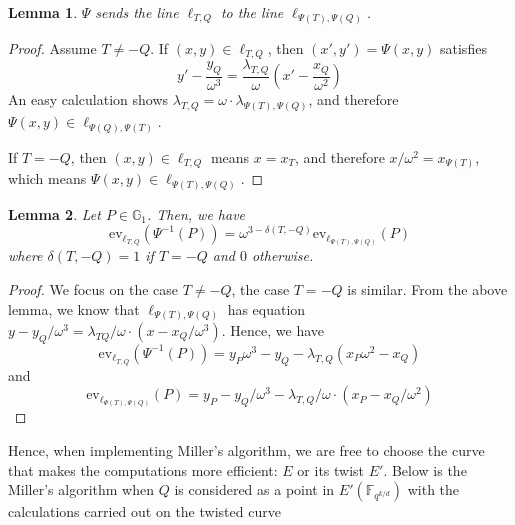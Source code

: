 \documentclass{article}
\newcommand{\gOne}{\mathbb{G}_1}
\newcommand{\ev}{\mathrm{ev}}
\newcommand{\fq}[1]{\mathbb{F}_{q^{#1}}}
\theoremstyle{remark}
\theoremstyle{plain}
\newtheorem{lemma}{Lemma}[section]
\begin{document}
\begin{lemma}
    $\Psi$ sends the line $\ell_{T,Q}$ to the line $\ell_{\Psi(T),\Psi(Q)}$.
\end{lemma}

\begin{proof}
    Assume $T \neq -Q$.
    If $(x,y) \in \ell_{T,Q}$, then $(x',y') = \Psi(x,y)$ satisfies
    \[
        y' - \frac{y_Q}{\omega^3} = \frac{\lambda_{T,Q}}{\omega} \left( x' - \frac{x_Q}{\omega^2} \right)
    \]
    An easy calculation shows $\lambda_{T,Q} = \omega \cdot \lambda_{\Psi(T),\Psi(Q)}$, and therefore $\Psi(x,y) \in \ell_{\Psi(Q),\Psi(T)}$.
    
    If $T = -Q$, then $(x,y) \in \ell_{T,Q}$ means $x = x_T$, and therefore $x / \omega^2 = x_{\Psi(T)}$, which means $\Psi(x,y) \in \ell_{\Psi(T),\Psi(Q)}$.
\end{proof}

\begin{lemma}
    \label{lem:relationBwBaseAndTwistedEval}
    Let $P \in \gOne$. Then, we have
    \[
        \ev_{\ell_{T,Q}}(\Psi^{-1}(P)) = \omega^{3 - \delta(T,-Q)} \ev_{\ell_{\Psi(T),\Psi(Q)}}(P)
    \]
    where $\delta(T,-Q) = 1$ if $T = -Q$ and $0$ otherwise.
\end{lemma}

\begin{proof}
    We focus on the case $T \neq -Q$, the case $T = -Q$ is similar.
    From the above lemma, we know that $\ell_{\Psi(T),\Psi(Q)}$ has equation $y - y_Q / \omega^3 = \lambda_{TQ} / \omega \cdot (x - x_Q / \omega^3)$.
    Hence, we have
    \[
        \ev_{\ell_{T,Q}}(\Psi^{-1}(P)) = y_P \omega^3 - y_Q - \lambda_{T,Q} (x_P \omega^2 - x_Q)
    \]
    and
    \[
        \ev_{\ell_{\Psi(T),\Psi(Q)}}(P) = y_P - y_Q / \omega^3 - \lambda_{T,Q} / \omega \cdot (x_P - x_Q / \omega^2)
    \]
\end{proof}

Hence, when implementing Miller's algorithm, we are free to choose the curve that makes the computations more efficient: $E$ or its twist $E'$.
Below is the Miller's algorithm when $Q$ is considered as a point in $E'(\fq{k/d})$ with the calculations carried out on the twisted curve
\end{document}

